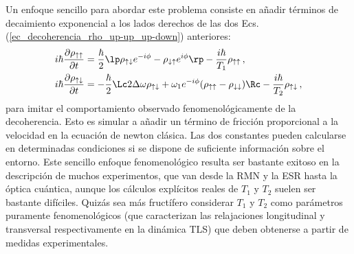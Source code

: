     Un enfoque sencillo para abordar este problema consiste en añadir términos de decaimiento exponencial a los lados derechos de las dos Ecs. (\ref{ec_decoherencia_rho_up-up_up-down})  anteriores:
    \begin{equation} \label{ec_decoherencia_rho_up-up_up-down_ficcion} 
        \begin{aligned}
        i \hbar \frac{\partial \rho_{\uparrow \uparrow}}{\partial t} & = \frac{\hbar}{2} \lp \rho_{\uparrow \downarrow} e^{-i \phi} - \rho_{\downarrow \uparrow} e^{i \phi} \rp - \frac{i \hbar}{T_1} \rho_{\uparrow \uparrow} \, , \\
        i \hbar \frac{\partial \rho_{\uparrow \downarrow}}{\partial t} & = 
        - \frac{\hbar}{2} \Lc 2 \Delta \omega \rho_{\uparrow \downarrow} + 
        \omega_1 e^{-i \phi} (\rho_{\uparrow \uparrow} - \rho_{\downarrow \downarrow}) \Rc - \frac{i \hbar}{T_2}  \rho_{\uparrow \downarrow} \, , 
        \end{aligned}
    \end{equation}
    para imitar el comportamiento observado fenomenológicamente de la decoherencia. Esto es simular a añadir un término de fricción proporcional a la velocidad en la ecuación de newton clásica. Las dos constantes pueden calcularse en determinadas condiciones si se dispone de suficiente información sobre el entorno. Este sencillo enfoque fenomenológico resulta ser bastante exitoso en la descripción de muchos experimentos, que van desde la RMN y la ESR hasta la óptica cuántica, aunque los cálculos explícitos reales de $T_1$ y $T_2$ suelen ser bastante difíciles. Quizás sea más fructífero considerar $T_1$ y $T_2$ como parámetros puramente fenomenológicos (que caracterizan las relajaciones longitudinal y transversal respectivamente en la dinámica TLS) que deben obtenerse a partir de medidas experimentales.
    
